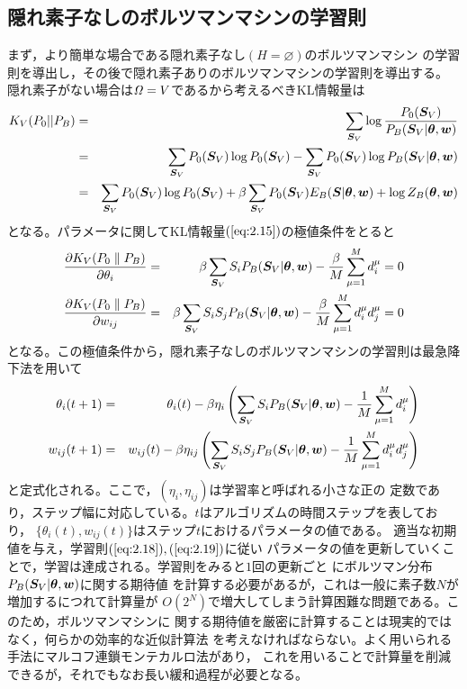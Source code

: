 \subsection{隠れ素子なしのボルツマンマシンの学習則}
まず，より簡単な場合である隠れ素子なし$(H=\varnothing)$のボルツマンマシン
の学習則を導出し，その後で隠れ素子ありのボルツマンマシンの学習則を導出する。
隠れ素子がない場合は$\mathit{\Omega}=V$であるから考えるべきKL情報量は
\begin{eqnarray}
K_{V}(P_{0}||P_{B})&=&\sum_{\bm{S}_{V}}\log\frac{P_{0}(\bm{S}_{V})}
{P_{B}(\bm{S}_{V}|\boldsymbol{\theta},\bm{w})}\nonumber\\
&=&\sum_{\bm{S}_{V}}P_{0}(\bm{S}_{V})\log P_{0}(\bm{S}_{V})-
\sum_{\bm{S}_{V}}P_{0}(\bm{S}_{V})\log
P_{B}(\bm{S}_{V}|\boldsymbol{\theta},\bm{w})\nonumber\\
&=&\sum_{\bm{S}_{V}}P_{0}(\bm{S}_{V})\log P_{0}(\bm{S}_{V})
+\beta\sum_{\bm{S}_{V}}P_{0}(\bm{S}_{V})E_{B}(\bm{S}|\boldsymbol{\theta},\bm{w})
+\log Z_{B}(\boldsymbol{\theta},\bm{w})\label{eq:2.15}
\end{eqnarray}
となる。パラメータに関してKL情報量$(\ref{eq:2.15})$の極値条件をとると
\begin{eqnarray}
\frac{\partial K_{V}(P_{0}\parallel P_{B})}{\partial\theta_{i}}
&=&\beta\sum_{\bm{S}_{V}}S_{i}P_{B}(\bm{S}_{V}|\boldsymbol{\theta},\bm{w})
-\frac{\beta}{M}\sum_{\mu=1}^{M}d_{i}^{\mu}=0\label{eq:2.16}\\
\frac{\partial K_{V}(P_{0}\parallel P_{B})}{\partial w_{ij}}
&=&\beta\sum_{\bm{S}_{V}}S_{i}S_{j}P_{B}(\bm{S}_{V}|\boldsymbol{\theta},\bm{w})
-\frac{\beta}{M}\sum_{\mu=1}^{M}d_{i}^{\mu}d_{j}^{\mu}=0
\label{eq:2.17}
\end{eqnarray}
となる。この極値条件から，隠れ素子なしのボルツマンマシンの学習則は最急降下法を用いて
\begin{eqnarray}
\theta_{i}(t+1)&=&\theta_{i}(t)-\beta\eta_{i}\left(
\sum_{\bm{S}_{V}}S_{i}P_{B}(\bm{S}_{V}|\boldsymbol{\theta},\bm{w})-\frac{1}{M}
\sum_{\mu=1}^{M}d_{i}^{\mu}\right)\label{eq:2.18}\\
w_{ij}(t+1)&=&w_{ij}(t)-\beta\eta_{ij}\left(
\sum_{\bm{S}_{V}}S_{i}S_{j}P_{B}(\bm{S}_{V}|\boldsymbol{\theta},\bm{w})
-\frac{1}{M}\sum_{\mu=1}^{M}d_{i}^{\mu}d_{j}^{\mu}\right)
\label{eq:2.19}
\end{eqnarray}
と定式化される。ここで，$(\eta_{i},\eta_{ij})$は学習率と呼ばれる小さな正の
定数であり，ステップ幅に対応している。$t$はアルゴリズムの時間ステップを表しており，
$\{\theta_{i}(t),w_{ij}(t)\}$はステップ$t$におけるパラメータの値である。
適当な初期値を与え，学習則$(\ref{eq:2.18}),(\ref{eq:2.19})$に従い
パラメータの値を更新していくことで，学習は達成される。学習則をみると$1$回の更新ごと
にボルツマン分布$P_{B}(\bm{S}_{V}|\boldsymbol{\theta},\bm{w})$に関する期待値
を計算する必要があるが，これは一般に素子数$N$が増加するにつれて計算量が
$O(2^{N})$で増大してしまう計算困難な問題である。このため，ボルツマンマシンに
関する期待値を厳密に計算することは現実的ではなく，何らかの効率的な近似計算法
を考えなければならない。よく用いられる手法にマルコフ連鎖モンテカルロ法があり，
これを用いることで計算量を削減できるが，それでもなお長い緩和過程が必要となる。
